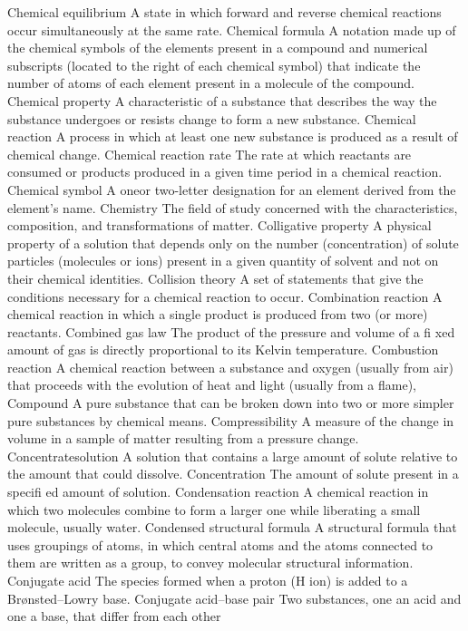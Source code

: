 \documentclass[10pt, roman]{article}
\begin{document}
Chemical equilibrium A state in which forward and reverse chemical reactions occur simultaneously at the same rate.
Chemical formula A notation made up of the chemical symbols of the elements present in a compound and numerical subscripts (located to the right of each chemical symbol) that indicate the number of atoms of each element present in a molecule of the compound.
Chemical property A characteristic of a substance that describes the way the substance undergoes or resists change to form a new substance.
Chemical reaction A process in which at least one new substance is produced as a result of chemical change.
Chemical reaction rate The rate at which reactants are consumed or products produced in a given time period in a chemical reaction. 
Chemical symbol A oneor two-letter designation for an element derived from the element’s name.
Chemistry The field of study concerned with the characteristics, composition, and transformations of matter.
Colligative property A physical property of a solution that depends only on the number (concentration) of solute particles (molecules or ions) present in a given quantity of solvent and not on their chemical identities.
Collision theory A set of statements that give the conditions necessary for a chemical reaction to occur.
Combination reaction A chemical reaction in which a single product is produced from two (or more) reactants.
Combined gas law The product of the pressure and volume of a fi xed amount of gas is directly proportional to its Kelvin temperature.
Combustion reaction A chemical reaction between a substance and oxygen (usually from air) that proceeds with the evolution of heat and light (usually from a flame), Compound A pure substance that can be broken down into two or more simpler pure substances by chemical means.
Compressibility A measure of the change in volume in a sample of matter resulting from a pressure change.
Concentratesolution A solution that contains a large amount of solute relative to the 
amount that could dissolve. Concentration The amount of solute present in a specifi ed amount of solution. Condensation reaction A chemical reaction in which two molecules combine to form a larger one while liberating 
a small molecule, usually water. Condensed structural formula A structural formula that uses groupings of atoms, in which central atoms and the atoms connected to them are written as a group, to convey molecular 
structural information. Conjugate acid The species formed when a proton (H ion) is added to a Brønsted–Lowry base. Conjugate acid–base pair Two substances, one an acid and one a base, that differ from each other 
\end{document}
